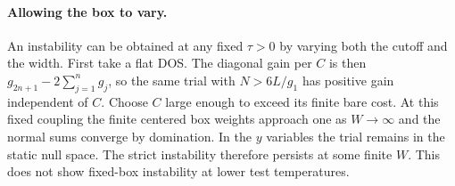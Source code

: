 \documentclass[11pt]{article}
\begin{document}
\paragraph{Allowing the box to vary.}
An instability can be obtained at any fixed $\tau>0$ by varying both the cutoff and the width. First take a flat DOS. The diagonal gain per $C$ is then $g_{2n+1}-2\sum_{j=1}^n g_j$, so the same trial with $N>6L/g_1$ has positive gain independent of $C$. Choose $C$ large enough to exceed its finite bare cost. At this fixed coupling the finite centered box weights approach one as $W\to\infty$ and the normal sums converge by domination. In the $y$ variables the trial remains in the static null space. The strict instability therefore persists at some finite $W$. This does not show fixed-box instability at lower test temperatures.
\end{document}
